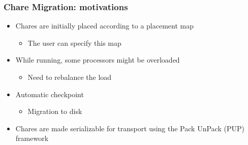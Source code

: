 


%
%
%
%
%

\begin{frame}[fragile]
\frametitle{Chare Migration: motivations}
\begin{itemize}
\item Chares are initially placed according to a placement map
\begin{itemize}
\item The user can specify this map
\end{itemize}
\item While running, some processors might be overloaded
\begin{itemize}
\item Need to rebalance the load
\end{itemize}
\item Automatic checkpoint
\begin{itemize}
\item Migration to disk
\end{itemize}
\item Chares are made serializable for transport using the Pack UnPack (PUP) framework
\end{itemize}
\end{frame}

